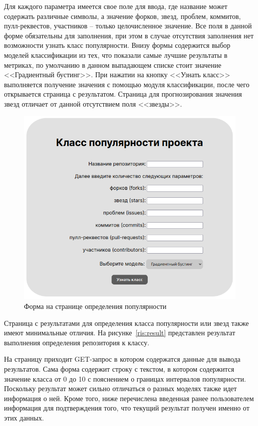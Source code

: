 Для каждого параметра имеется свое поле для ввода, где название может содержать различные символы, а значение форков, звезд, проблем, коммитов, пулл-реквестов, участников -- только целочисленное значение. Все поля в данной форме обязательны для заполнения, при этом в случае отсутствия заполнения нет возможности узнать класс популярности. Внизу формы содержится выбор моделей классификации из тех, что показали самые лучшие результаты в метриках, по умолчанию в данном выпадающем списке стоит значение <<Градиентный бустинг>>. При нажатии на кнопку <<Узнать класс>> выполняется получение значения с помощью модуля классификации, после чего открывается страница с результатом. Страница для прогнозирования значения звезд отличает от данной отсутствием поля <<звезды>>.

\begin{figure}[h]
    \centering
    \includegraphics[width=1\linewidth]{pic/input.png}
    \vspace{-0.5em}    \caption{Форма на странице определения популярности}
    \label{ris:input}
\end{figure}
\vspace{1em}

Страница с результатами для определения класса популярности или звезд также имеют минимальные отличия. На рисунке~\ref{ris:result} представлен результат выполнения определения репозитория к классу.

На страницу приходит GET-запрос в котором содержатся данные для вывода результатов. Сама форма содержит строку с текстом, в котором содержится значение класса от 0 до 10 с пояснением о границах интервалов популярности. Поскольку результат может сильно отличаться о разных моделях также идет информация о ней. Кроме того, ниже перечислена введенная ранее пользователем информация для подтверждения того, что текущий результат получен именно от этих данных.

